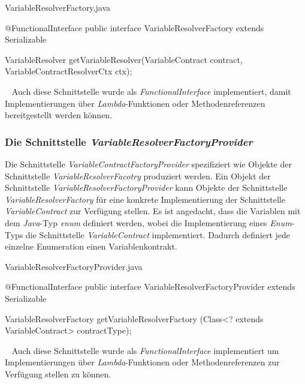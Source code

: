 \begin{program}[h]
\caption{VariableResolverFactory.java}
\label{prog:variableResolverFactory}
\begin{JavaCode}
@FunctionalInterface
public interface VariableResolverFactory extends Serializable {

  VariableResolver getVariableResolver(VariableContract contract,
                                       VariableContractResolverCtx ctx);
}
\end{JavaCode}
\end{program}
\ \newline
Auch diese Schnittstelle wurde als \emph{FunctionalInterface} implementiert, damit Implementierungen über \emph{Lambda}-Funktionen oder Methodenreferenzen bereitgestellt werden können.

\subsubsection{Die Schnittstelle \emph{VariableResolverFactoryProvider}}
\label{sec:VariableResolverFactoryProvider}
Die Schnittstelle \emph{VariableContractFactoryProvider} spezifiziert wie Objekte der Schnittstelle \emph{VariableResolverFacotry} produziert werden. Ein Objekt der Schnittstelle \emph{VariableResolverFactoryProvider} kann Objekte der Schnittstelle \emph{VariableResolverFactory} für eine konkrete Implementierung der Schnittstelle \emph{VariableContract} zur Verfügung stellen. Es ist angedacht, dass die Variablen mit dem \emph{Java}-Typ \emph{enum} definiert werden, wobei die Implementierung eines \emph{Enum}-Typs die Schnittstelle \emph{VariableContract} implementiert. Dadurch definiert jede einzelne Enumeration einen Variablenkontrakt. 

\begin{program}[h]
\caption{VariableResolverFactoryProvider.java}
\label{prog:variableResolverFactoryProvider}
\begin{JavaCode}
@FunctionalInterface
public interface VariableResolverFactoryProvider extends Serializable {

    VariableResolverFactory getVariableResolverFactory
            (Class<? extends VariableContract> contractType);
}
\end{JavaCode}
\end{program}
\ \newline
Auch diese Schnittstelle wurde als \emph{FunctionalInterface} implementiert um Implementierungen über \emph{Lambda}-Funktionen oder Methodenreferenzen zur Verfügung stellen zu können.

